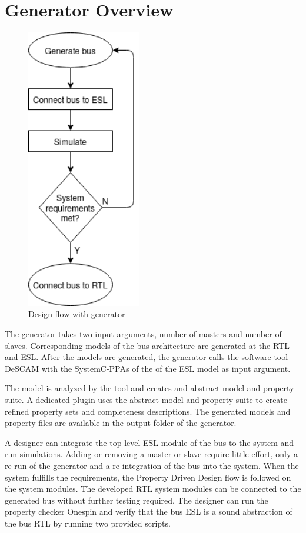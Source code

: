 \section{Generator Overview}
\begin{figure}
\includegraphics[width=5cm]{figs/Generator.png}
\caption{Design flow with generator}\label{fig:dflow}
\end{figure}  

The generator takes two input arguments, number of masters and number of slaves. Corresponding models of the bus architecture are generated at the RTL and ESL.
After the models are generated, the generator calls the software tool DeSCAM with the SystemC-PPAs of the of the ESL model as input argument. \par The model is analyzed by the tool and creates and abstract model and property suite. A dedicated plugin uses the abstract model and property suite to create refined property sets and completeness descriptions. The generated models and property files are available in the output folder of the generator. \par A designer can integrate the top-level ESL module of the bus to the system and run simulations. Adding or removing a master or slave require little effort, only a re-run of the generator and a re-integration of the bus into the system. When the system fulfills the requirements, the Property Driven Design flow is followed on the system modules. The developed RTL system modules can be connected to the generated bus without further testing required. The designer can run the property checker Onespin and verify that the bus ESL is a sound abstraction of the bus RTL by running two provided scripts. \par
\vspace{2.0cm} 


